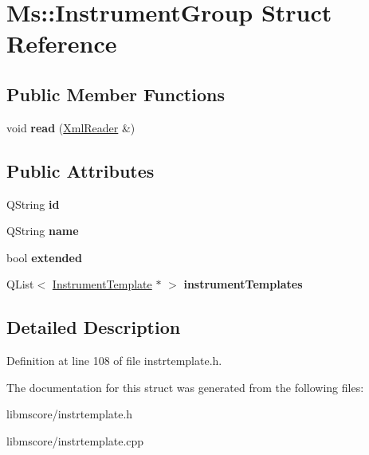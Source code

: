 \hypertarget{struct_ms_1_1_instrument_group}{}\section{Ms\+:\+:Instrument\+Group Struct Reference}
\label{struct_ms_1_1_instrument_group}
\subsection*{Public Member Functions}
\begin{DoxyCompactItemize}
\item 
\mbox{\label{struct_ms_1_1_instrument_group_a9ccb20de632888b1b450613200835c22}} 
void {\bfseries read} (\hyperlink{class_ms_1_1_xml_reader}{Xml\+Reader} \&)
\end{DoxyCompactItemize}
\subsection*{Public Attributes}
\begin{DoxyCompactItemize}
\item 
\mbox{\label{struct_ms_1_1_instrument_group_a9b47ce8cf456f84b98a3a2c6df523d70}} 
Q\+String {\bfseries id}
\item 
\mbox{\label{struct_ms_1_1_instrument_group_a673cfbd6a044777a6554257b89a9d5a5}} 
Q\+String {\bfseries name}
\item 
\mbox{\label{struct_ms_1_1_instrument_group_a768fcff8d496d37e0bdf826f9db8360f}} 
bool {\bfseries extended}
\item 
\mbox{\label{struct_ms_1_1_instrument_group_ada252fba9103fa38aea6fdc9920dd502}} 
Q\+List$<$ \hyperlink{class_ms_1_1_instrument_template}{Instrument\+Template} $\ast$ $>$ {\bfseries instrument\+Templates}
\end{DoxyCompactItemize}


\subsection{Detailed Description}


Definition at line 108 of file instrtemplate.\+h.



The documentation for this struct was generated from the following files\+:\begin{DoxyCompactItemize}
\item 
libmscore/instrtemplate.\+h\item 
libmscore/instrtemplate.\+cpp\end{DoxyCompactItemize}
